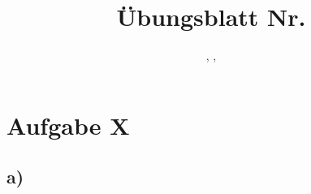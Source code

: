 \documentclass[12pt]{scrartcl}
\title{\courceShort \\ \large Übungsblatt Nr. \workSheetNr}
\author{\memberA, \memberB, \memberC}
\date{\dateOfFinishing}
\begin{document}
	
	\maketitle
	\newpage
	
	\section*{Aufgabe X}
	\subsection*{a)}
	
\end{document}
